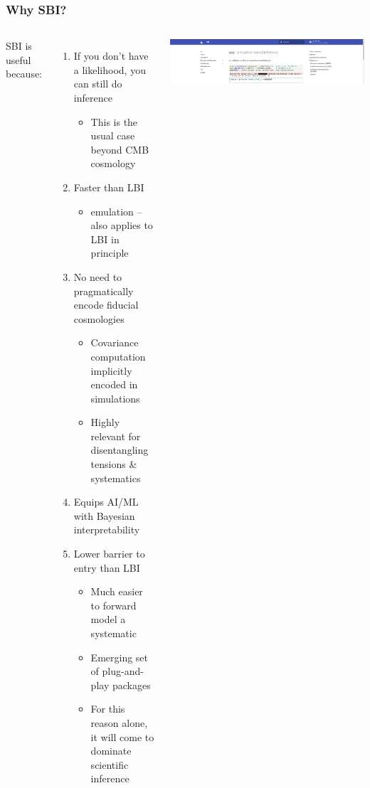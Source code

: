 \documentclass[aspectratio=169]{beamer}
\begin{document}
\begin{frame}
    \frametitle{Why SBI?}
    \begin{columns}
        SBI is useful because:
        \begin{enumerate}
            \item If you don't have a likelihood, you can still do inference
                \begin{itemize}
                    \item This is the usual case beyond CMB cosmology
                \end{itemize}
            \item Faster than LBI
                \begin{itemize}
                    \item emulation -- also applies to LBI in principle
                \end{itemize}
            \item No need to pragmatically encode fiducial cosmologies
                \begin{itemize}
                    \item Covariance computation implicitly encoded in simulations
                    \item Highly relevant for disentangling tensions \& systematics
                \end{itemize}
            \item Equips AI/ML with Bayesian interpretability
            \item Lower barrier to entry than LBI
                \begin{itemize}
                    \item Much easier to forward model a systematic
                    \item Emerging set of plug-and-play packages
                    \item For this reason alone, it will come to dominate scientific inference
                \end{itemize}
        \end{enumerate}
        \includegraphics[width=\textwidth]{figures/sbi_screenshot}

\end{columns}
\end{frame}
\end{document}
